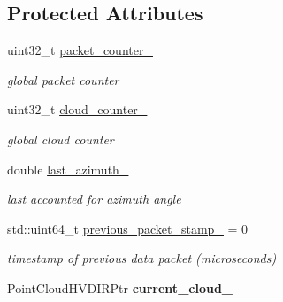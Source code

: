 \subsection*{Protected Attributes}
\begin{DoxyCompactItemize}
\item 
\hypertarget{structquanergy_1_1client_1_1DataPacketParserM8_a6e7825f339f311dc6cf4fbad4d1df44b}{uint32\-\_\-t \hyperlink{structquanergy_1_1client_1_1DataPacketParserM8_a6e7825f339f311dc6cf4fbad4d1df44b}{packet\-\_\-counter\-\_\-}}\label{structquanergy_1_1client_1_1DataPacketParserM8_a6e7825f339f311dc6cf4fbad4d1df44b}

\begin{DoxyCompactList}\small\item\em global packet counter \end{DoxyCompactList}\item 
\hypertarget{structquanergy_1_1client_1_1DataPacketParserM8_aac2fa9bb2410d065a16cb32458d134b3}{uint32\-\_\-t \hyperlink{structquanergy_1_1client_1_1DataPacketParserM8_aac2fa9bb2410d065a16cb32458d134b3}{cloud\-\_\-counter\-\_\-}}\label{structquanergy_1_1client_1_1DataPacketParserM8_aac2fa9bb2410d065a16cb32458d134b3}

\begin{DoxyCompactList}\small\item\em global cloud counter \end{DoxyCompactList}\item 
\hypertarget{structquanergy_1_1client_1_1DataPacketParserM8_a58460ac04bc0d7bc1b410e09a06e5692}{double \hyperlink{structquanergy_1_1client_1_1DataPacketParserM8_a58460ac04bc0d7bc1b410e09a06e5692}{last\-\_\-azimuth\-\_\-}}\label{structquanergy_1_1client_1_1DataPacketParserM8_a58460ac04bc0d7bc1b410e09a06e5692}

\begin{DoxyCompactList}\small\item\em last accounted for azimuth angle \end{DoxyCompactList}\item 
\hypertarget{structquanergy_1_1client_1_1DataPacketParserM8_a1edb9bd53f79f9bc0af0772dc08726d2}{std\-::uint64\-\_\-t \hyperlink{structquanergy_1_1client_1_1DataPacketParserM8_a1edb9bd53f79f9bc0af0772dc08726d2}{previous\-\_\-packet\-\_\-stamp\-\_\-} = 0}\label{structquanergy_1_1client_1_1DataPacketParserM8_a1edb9bd53f79f9bc0af0772dc08726d2}

\begin{DoxyCompactList}\small\item\em timestamp of previous data packet (microseconds) \end{DoxyCompactList}\item 
\hypertarget{structquanergy_1_1client_1_1DataPacketParserM8_a6e32df4d489bc2989d57222eb0989f28}{Point\-Cloud\-H\-V\-D\-I\-R\-Ptr {\bfseries current\-\_\-cloud\-\_\-}}\label{structquanergy_1_1client_1_1DataPacketParserM8_a6e32df4d489bc2989d57222eb0989f28}


\end{DoxyCompactItemize}
